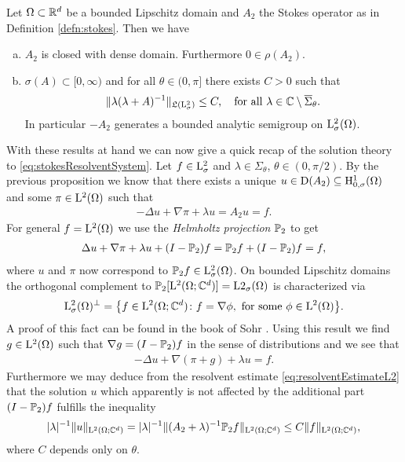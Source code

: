 \begin{prop}
  Let $\Omega \subset \mathbb{R}^d$ be a bounded Lipschitz domain and $A_2$ the Stokes operator as in Definition \ref{defn:stokes}. Then we have
  \begin{enumerate}[a)]
    \item $A_2$ is closed with dense domain. Furthermore $0 \in \rho(A_2)$.
    \item $\sigma(A) \subset [0,\infty)$ and for all $\theta \in (0,\pi]$ there exists $C > 0$ such that
      \begin{align}
        \label{eq:resolventEstimateL2}
        \| \lambda(\lambda + A)^{-1} \|_{\mathfrak{L}(\mathrm{L}^2_\sigma)} \leq C, \quad\text{for all } \lambda \in \mathbb{C} \setminus \overline \Sigma_\theta.
      \end{align}
      In particular $-A_2$ generates a bounded analytic semigroup on $\mathrm{L}^2_\sigma(\Omega)$.
  \end{enumerate}
\end{prop}

With these results at hand we can now give a quick recap of the solution theory to \eqref{eq:stokesResolventSystem}.
Let $f \in \mathrm{L}^2_\sigma$ and $\lambda \in \Sigma_\theta$, $\theta \in (0, \pi/2)$.
By the previous proposition we know that there exists a unique $u \in \mathrm{D}(A_2) \subseteq \mathrm{H}^1_{0,\sigma}(\Omega)$ and some $\pi \in \mathrm{L}^2(\Omega)$ such that
\begin{align*}
  -\Delta u + \nabla \pi + \lambda u = A_2 u = f.
\end{align*}
For general $f = \mathrm{L}^2(\Omega)$ we use the \emph{Helmholtz projection} $\mathbb{P}_2$ to get
\begin{align*}
  \Delta u + \nabla \pi + \lambda u + (I - \mathbb{P}_2) f = \mathbb{P}_2 f + (I - \mathbb{P}_2) f = f,
\end{align*}
where $u$ and $\pi$ now correspond to $\mathbb{P}_2 f \in \mathrm{L}^2_\sigma(\Omega)$. On bounded Lipschitz domains the orthogonal complement to $\mathbb{P}_2[\mathrm{L}^2(\Omega; \mathbb{C}^d)] = \mathrm{L}2_\sigma(\Omega)$ is characterized via
\begin{align*}
  \mathrm{L}^2_\sigma(\Omega)^\perp = \big\{ f \in \mathrm{L}^2(\Omega; \mathbb{C}^d) \colon f = \nabla \phi, \text{ for some } \phi \in \mathrm{L}^2(\Omega) \big\}.
\end{align*}
A proof of this fact can be found in the book of Sohr \cite[Lemma 2.5.3]{sohr}.
Using this result we find $g \in \mathrm{L}^2(\Omega)$ such that $\nabla g = (I - \mathbb{P}_2)f$ in the sense of distributions and we see that
\begin{align*}
  -\Delta u + \nabla( \pi + g ) + \lambda u = f.
\end{align*}
Furthermore we may deduce from the resolvent estimate \eqref{eq:resolventEstimateL2} that the solution $u$ which apparently is not affected by the additional part $(I-\mathbb{P}_2)f$ fulfills the inequality
\begin{align*}
  |\lambda|^{-1} \| u\|_{\mathrm{L}^2(\Omega; \mathbb{C}^d)} = |\lambda|^{-1} \|(A_2 + \lambda)^{-1} \mathbb{P}_2 f \|_{\mathrm{L}^2(\Omega; \mathbb{C}^d)} \leq C \| f \|_{\mathrm{L}^2(\Omega; \mathbb{C}^d)},
\end{align*}
where $C$ depends only on $\theta$.

